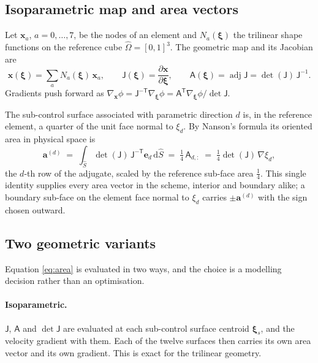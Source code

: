 \documentclass[11pt,a4paper]{article}
\newcommand{\bx}{\mathbf{x}}
\newcommand{\ba}{\mathbf{a}}
\newcommand{\bJ}{\mathsf{J}}
\newcommand{\bA}{\mathsf{A}}
\newcommand{\dd}{\,\mathrm{d}}
\begin{document}
\subsection{Isoparametric map and area vectors}

Let $\bx_a$, $a = 0,\dots,7$, be the nodes of an element and $N_a(\boldsymbol{\xi})$ the
trilinear shape functions on the reference cube $\hat\Omega = [0,1]^3$. The geometric map and
its Jacobian are
\begin{equation}
  \bx(\boldsymbol{\xi}) = \sum_{a} N_a(\boldsymbol{\xi})\, \bx_a ,
  \qquad
  \bJ(\boldsymbol{\xi}) = \frac{\partial \bx}{\partial \boldsymbol{\xi}} ,
  \qquad
  \bA(\boldsymbol{\xi}) = \operatorname{adj} \bJ = \det(\bJ)\, \bJ^{-1} .
  \label{eq:jac}
\end{equation}
Gradients push forward as $\nabla_{\!\bx} \phi = \bJ^{-\mathsf T} \nabla_{\!\boldsymbol\xi}
\phi = \bA^{\mathsf T} \nabla_{\!\boldsymbol\xi} \phi / \det \bJ$.

The sub-control surface associated with parametric direction $d$ is, in the reference
element, a quarter of the unit face normal to $\xi_d$. By Nanson's formula its oriented area
in physical space is
\begin{equation}
  \ba^{(d)} \;=\; \int_{\hat S} \det(\bJ)\, \bJ^{-\mathsf T} \mathbf{e}_d \dd \hat S
  \;=\; \tfrac14 \, \bA_{d,:} \;=\; \tfrac14 \det(\bJ) \, \nabla \xi_d ,
  \label{eq:area}
\end{equation}
the $d$-th row of the adjugate, scaled by the reference sub-face area $\tfrac14$. This single
identity supplies every area vector in the scheme, interior and boundary alike; a boundary
sub-face on the element face normal to $\xi_d$ carries $\pm\ba^{(d)}$ with the sign chosen
outward.

\subsection{Two geometric variants}
\label{sec:geomvariants}

Equation \eqref{eq:area} is evaluated in two ways, and the choice is a modelling decision
rather than an optimisation.

\paragraph{Isoparametric.} $\bJ$, $\bA$ and $\det\bJ$ are evaluated at each sub-control
surface centroid $\boldsymbol{\xi}_s$, and the velocity gradient with them. Each of the twelve
surfaces then carries its own area vector and its own gradient. This is exact for the
trilinear geometry.
\end{document}

